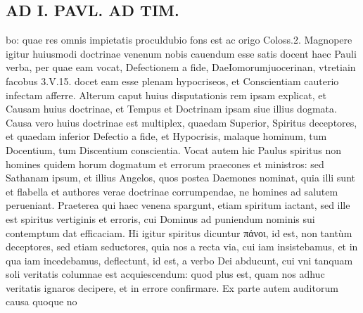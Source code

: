 \documentclass{article}
\begin{document}
\begin{pages}
\section*{AD I. PAVL. AD TIM. }
\marginpar{[ p.1o4 ]}\pstart bo: quae res omnis impietatis proculdubio fons est ac origo Coloss.2.  \pend\pstart Magnopere igitur huiusmodi doctrinae venenum nobis cauendum esse satis docent haec Pauli verba, per quae eam vocat, Defectionem a fide, DaeIomorumjuocerinan, vtretiain facobus 3.V.15. docet eam esse plenam hypocriseos, et Conscientiam cauterio infectam afferre.  \pend\pstart Alterum caput huius disputationis rem ipsam explicat, et Causam huius doctrinae, et Tempus et Doctrinam ipsam siue illius dogmata. Causa vero huius doctrinae est multiplex, quaedam Superior, Spiritus deceptores, et quaedam inferior Defectio a fide, et Hypocrisis, malaque  hominum, tum Docentium, tum Discentium conscientia. Vocat autem hic Paulus spiritus non homines quidem horum dogmatum et errorum praecones et ministros: sed Sathanam ipsum, et illius Angelos, quos postea Daemones nominat, quia illi sunt et flabella et authores verae doctrinae corrumpendae, ne homines ad salutem perueniant. Praeterea qui haec venena spargunt, etiam spiritum iactant, sed ille est spiritus vertiginis et erroris, cui Dominus ad puniendum nominis sui contemptum dat efficaciam. Hi igitur spiritus dicuntur πάνοι, id est, non tantùm deceptores, sed etiam seductores, quia nos a recta via, cui iam insistebamus, et in qua iam incedebamus, deflectunt, id est, a verbo Dei abducunt, cui vni tanquam soli veritatis columnae est acquiescendum: quod plus est, quam nos adhuc veritatis ignaros decipere, et in errore confirmare.  \pend\pstart Ex parte autem auditorum causa quoque no\pend

\end{pages}
\end{document}
